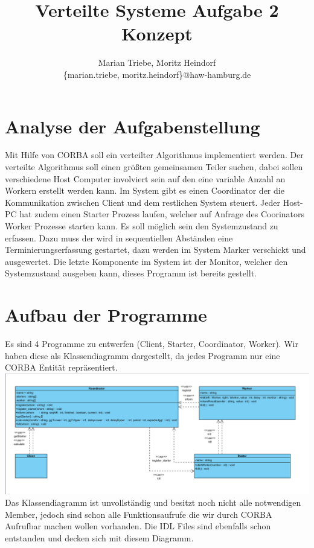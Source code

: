 \documentclass{article}
\begin{document}
\date{}

\title{Verteilte Systeme Aufgabe 2 Konzept}

\author{
  Marian Triebe, Moritz Heindorf\\
  \{marian.triebe, moritz.heindorf\}@haw-hamburg.de
}

\maketitle

\section{Analyse der Aufgabenstellung}
Mit Hilfe von CORBA soll ein verteilter Algorithmus implementiert werden. Der verteilte Algorithmus soll einen größten gemeinsamen Teiler suchen, dabei sollen verschiedene Host Computer involviert sein auf den eine variable Anzahl an Workern erstellt werden kann. Im System gibt es einen Coordinator der die Kommunikation zwischen Client und dem restlichen System steuert. Jeder Host-PC hat zudem einen Starter Prozess laufen, welcher auf Anfrage des Coorinators Worker Prozesse starten kann.
Es soll möglich sein den Systemzustand zu erfassen. Dazu muss der wird in sequentiellen Abständen eine Terminierungserfassung gestartet, dazu werden im System Marker verschickt und ausgewertet. Die letzte Komponente im System ist der Monitor, welcher den Systemzustand ausgeben kann, dieses Programm ist bereits gestellt.

\section{Aufbau der Programme}
Es sind 4 Programme zu entwerfen (Client, Starter, Coordinator, Worker). Wir haben diese als Klassendiagramm dargestellt, da jedes Programm nur eine CORBA Entität repräsentiert.\\
\includegraphics[scale=.40]{Documents/ClassDiagram}\\
Das Klassendiagramm ist unvollständig und besitzt noch nicht alle notwendigen Member, jedoch sind schon alle Funktionsaufrufe die wir durch CORBA Aufrufbar machen wollen vorhanden. Die IDL Files sind ebenfalls schon entstanden und decken sich mit diesem Diagramm.
\end{document}
